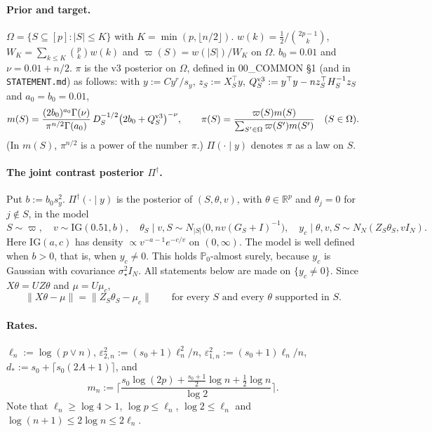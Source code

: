 \documentclass[11pt]{article}
\theoremstyle{remark}
\newcommand{\R}{\mathbb R}
\renewcommand{\P}{\mathbb P}
\newcommand{\Pd}{\Pi^\dagger}
\newcommand{\ve}{\varepsilon}
\newcommand{\vp}{\varpi}
\newcommand{\IG}{\mathrm{IG}}
\newcommand{\sst}{\sigma_\star}
\begin{document}
\paragraph{Prior and target.} $\Omega=\{S\subseteq[p]:|S|\le K\}$ with $K=\min(p,\lfloor n/2\rfloor)$. $w(k)=\tfrac12/\binom{2p-1}{k}$, $W_K=\sum_{k\le K}\binom pkw(k)$ and $\vp(S)=w(|S|)/W_K$ on $\Omega$. $b_0=0.01$ and $\nu=0.01+n/2$. $\pi$ is the v3 posterior on $\Omega$, defined in 00\_COMMON \S1 (and in \texttt{STATEMENT.md}) as follows: with $y:=Cy^r/s_y$, $z_S:=X_S^\top y$, $Q^{\rm v3}_S:=y^\top y-nz_S^\top H_S^{-1}z_S$ and $a_0=b_0=0.01$,
\[
m(S)=\frac{(2b_0)^{a_0}\Gamma(\nu)}{\pi^{n/2}\Gamma(a_0)}\,D_S^{-1/2}\big(2b_0+Q^{\rm v3}_S\big)^{-\nu},\qquad \pi(S)=\frac{\vp(S)m(S)}{\sum_{S'\in\Omega}\vp(S')m(S')}\quad(S\in\Omega).
\]
(In $m(S)$, $\pi^{n/2}$ is a power of the number $\pi$.) $\Pi(\cdot\mid y)$ denotes $\pi$ as a law on $S$.

\paragraph{The joint contrast posterior $\Pd$.} Put $b:=b_0s_y^2$. $\Pd(\cdot\mid y)$ is the posterior of $(S,\theta,v)$, with $\theta\in\R^p$ and $\theta_j=0$ for $j\notin S$, in the model
\[
S\sim\vp,\quad v\sim\IG(0.51,b),\quad \theta_S\mid v,S\sim N_{|S|}\big(0,nv(G_S+I)^{-1}\big),\quad y_c\mid\theta,v,S\sim N_N(Z_S\theta_S,vI_N).
\]
Here $\IG(a,c)$ has density $\propto v^{-a-1}e^{-c/v}$ on $(0,\infty)$. The model is well defined when $b>0$, that is, when $y_c\ne0$. This holds $\P_0$-almost surely, because $y_c$ is Gaussian with covariance $\sst^2I_N$. All statements below are made on $\{y_c\ne0\}$. Since $X\theta=UZ\theta$ and $\mu=U\mu_c$,
\begin{equation}\label{eq:normequal}
\|X\theta-\mu\|=\|Z_S\theta_S-\mu_c\|\qquad\text{for every $S$ and every $\theta$ supported in $S$.}
\end{equation}

\paragraph{Rates.} $\ell_n:=\log(p\vee n)$, $\ve_{2,n}^2:=(s_0+1)\ell_n^2/n$, $\ve_{1,n}^2:=(s_0+1)\ell_n/n$, $d_\ast:=s_0+\lceil s_0(2A+1)\rceil$, and
\[
m_n:=\Big\lceil\frac{s_0\log(2p)+\frac{s_0+1}2\log n+\frac12\log n}{\log 2}\Big\rceil .
\]
Note that $\ell_n\ge\log4>1$, $\log p\le\ell_n$, $\log2\le\ell_n$ and $\log(n+1)\le2\log n\le2\ell_n$.
\end{document}
